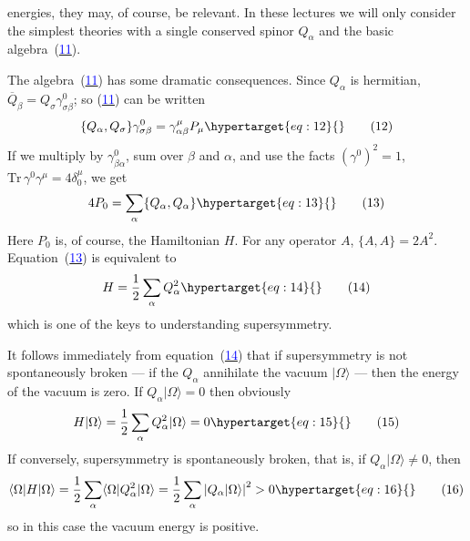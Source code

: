 \documentclass[11pt,a4paper]{article}
\newcommand{\eqtarget}[1]{\hypertarget{eq:#1}{\mathstrut}\tag{#1}}
\newcommand{\eqnref}[1]{(\hyperlink{eq:#1}{\textcolor{blue}{#1}})}
\begin{document}
\begingroup
\renewcommand{\thefootnote}{\fnsymbol{footnote}}
\endgroup


energies, they may, of course, be relevant. In these lectures we
will only consider the simplest theories with a single conserved
spinor $Q_\alpha$ and the basic algebra~\eqnref{11}.

The algebra~\eqnref{11} has some dramatic consequences. Since $Q_\alpha$ is
hermitian, $\overline{Q}_\beta = Q_\sigma \gamma^0_{\sigma\beta}$; so \eqnref{11} can be written
\begin{equation}
\{Q_\alpha, Q_\sigma\}\gamma^0_{\sigma\beta} = \gamma^\mu_{\alpha\beta} P_\mu
\eqtarget{12}
\end{equation}
If we multiply by $\gamma^0_{\beta\alpha}$, sum over $\beta$ and $\alpha$, and use the facts $(\gamma^0)^2 = 1$,
$\mathrm{Tr}\,\gamma^0 \gamma^\mu = 4\delta^\mu_0$, we get
\begin{equation}
4P_0 = \sum_\alpha \{Q_\alpha, Q_\alpha\}
\eqtarget{13}
\end{equation}
Here $P_0$ is, of course, the Hamiltonian $H$. For any operator $A$,
$\{A, A\} = 2A^2$. Equation~\eqnref{13} is equivalent to
\begin{equation}
H = \frac{1}{2}\sum_\alpha Q_\alpha^2
\eqtarget{14}
\end{equation}
which is one of the keys to understanding supersymmetry.

It follows immediately from equation~\eqnref{14} that if supersymmetry
is not spontaneously broken --- if the $Q_\alpha$ annihilate the vacuum
$|\Omega\rangle$ --- then the energy of the vacuum is zero. If $Q_\alpha |\Omega\rangle = 0$ then
obviously
\begin{equation}
H |\Omega\rangle = \frac{1}{2}\sum_\alpha Q_\alpha^2 |\Omega\rangle = 0
\eqtarget{15}
\end{equation}
If conversely, supersymmetry is spontaneously broken, that is, if
$Q_\alpha |\Omega\rangle \neq 0$, then
\begin{equation}
\langle \Omega | H | \Omega \rangle = \frac{1}{2}\sum_\alpha \langle \Omega | Q_\alpha^2 | \Omega \rangle = \frac{1}{2}\sum_\alpha \left|Q_\alpha |\Omega\rangle\right|^2 > 0
\eqtarget{16}
\end{equation}
so in this case the vacuum energy is positive.\begingroup\renewcommand{\thefootnote}{\fnsymbol{footnote}}\footnotemark[1]\endgroup
\end{document}
